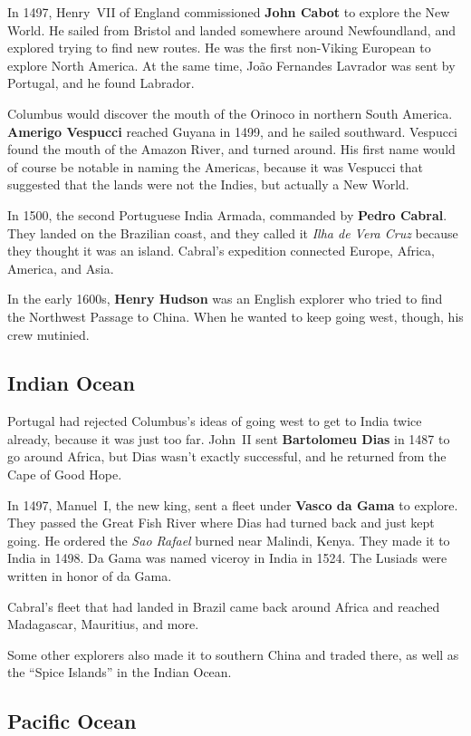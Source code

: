 In 1497, Henry~VII of England commissioned \textbf{John Cabot} to explore the New World.
He sailed from Bristol and landed somewhere around Newfoundland,
and explored trying to find new routes.
He was the first non-Viking European to explore North America.
At the same time, Jo\~ao Fernandes Lavrador was sent by Portugal, and he found Labrador.

Columbus would discover the mouth of the Orinoco in northern South America.
\textbf{Amerigo Vespucci} reached Guyana in 1499, and he sailed southward.
Vespucci found the mouth of the Amazon River, and turned around.
His first name would of course be notable in naming the Americas,
because it was Vespucci that suggested that the lands were not the Indies, but actually a New World.

In 1500, the second Portuguese India Armada, commanded by \textbf{Pedro Cabral}.
They landed on the Brazilian coast,
and they called it \textit{Ilha de Vera Cruz} because they thought it was an island.
Cabral's expedition connected Europe, Africa, America, and Asia.

In the early 1600s,
\textbf{Henry Hudson} was an English explorer who tried to find the Northwest Passage to China.
When he wanted to keep going west, though, his crew mutinied.

\subsection*{Indian Ocean}

Portugal had rejected Columbus's ideas of going west to get to India twice already,
because it was just too far.
John~II sent \textbf{Bartolomeu Dias} in 1487 to go around Africa,
but Dias wasn't exactly successful, and he returned from the Cape of Good Hope.

In 1497, Manuel~I, the new king, sent a fleet under \textbf{Vasco da Gama} to explore.
They passed the Great Fish River where Dias had turned back and just kept going.
He ordered the \textit{Sao Rafael} burned near Malindi, Kenya.
They made it to India in 1498.
Da Gama was named viceroy in India in 1524.
The Lusiads were written in honor of da Gama.

Cabral's fleet that had landed in Brazil came back around Africa
and reached Madagascar, Mauritius, and more.

Some other explorers also made it to southern China and traded there,
as well as the ``Spice Islands'' in the Indian Ocean.

\subsection*{Pacific Ocean}


